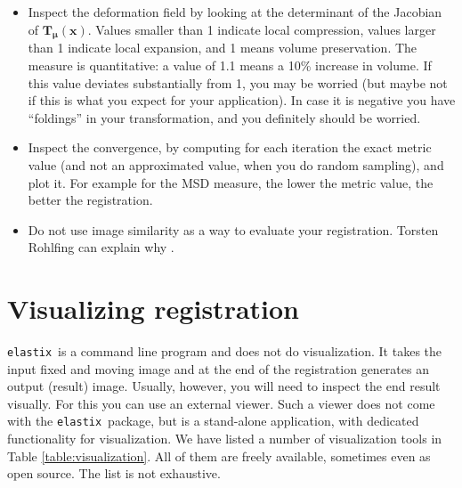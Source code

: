 \documentclass[]{report}
\newcommand{\elastix}{\texttt{elastix}}
\newcommand{\vmu}{\bm{\mu}}
\newcommand{\vTmx}{\bm{T}_{\vmu}(\bm{x})}
\begin{document}
\begin{itemize}
\item Inspect the deformation field by looking at the determinant of
the Jacobian of $\vTmx$. Values smaller than 1 indicate local
compression, values larger than 1 indicate local expansion, and 1
means volume preservation. The measure is quantitative: a value of
1.1 means a 10\% increase in volume. If this value deviates
substantially from 1, you may be worried (but maybe not if this is
what you expect for your application). In case it is negative you
have ``foldings'' in your transformation, and you definitely should
be worried.

\item Inspect the convergence, by computing for each iteration
the exact metric value (and not an approximated value, when you do
random sampling), and plot it. For example for the MSD measure, the
lower the metric value, the better the registration.

\item Do not use image similarity as a way to evaluate your
registration. Torsten Rohlfing can explain why \cite{Rohlfing2012}.

\end{itemize}


\section{Visualizing registration}\label{sec:visualization}

\elastix\ is a command line program and does not do visualization.
It takes the input fixed and moving image and at the end of the
registration generates an output (result) image. Usually, however,
you will need to inspect the end result visually. For this you can
use an external viewer. Such a viewer does not come with the
\elastix\ package, but is a stand-alone application, with dedicated
functionality for visualization. We have listed a number of
visualization tools in Table \ref{table:visualization}. All of them
are freely available, sometimes even as open source. The list is not
exhaustive.
\end{document}
